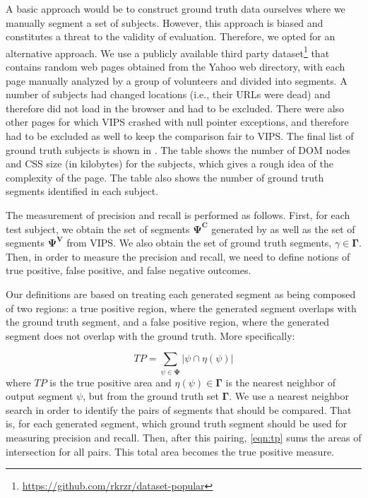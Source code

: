 A basic approach would be to construct ground truth data ourselves
where we manually segment a set of subjects.
However, this approach is biased
and constitutes a threat to the validity of evaluation.
Therefore, we opted for an alternative approach. 
We use a publicly available third party dataset\footnote{\url{https://github.com/rkrzr/dataset-popular}}
that contains random web pages obtained from the Yahoo web directory,
with each page manually analyzed by a group of volunteers and divided into segments. 
A number of subjects had changed locations (i.e., their URLs were dead)
and therefore did not load in the browser and had to be excluded.
There were also other pages for which 
VIPS crashed with null pointer exceptions,
and therefore had to be excluded as well to keep the comparison fair to VIPS.
The final list of ground truth subjects
is shown in .
The table shows the number of DOM nodes and CSS size (in kilobytes)
for the subjects, which gives a rough idea of the complexity of the page.
The table also shows the number of ground truth segments identified in each subject.



The measurement of precision and recall is performed as follows.
First, for each test subject,
we obtain the set of segments $\mathbf{\Psi^C}$ generated by \toolname
as well as the set of segments $\mathbf{\Psi^V}$ from VIPS.
We also obtain the set of ground truth segments, $\gamma \in \mathbf{\Gamma}$.
Then, in order to measure the precision and recall, we need to define 
notions of true positive, false positive, and false negative outcomes.

Our definitions are based on treating each generated segment as being composed of two regions:
a true positive region, where the generated segment overlaps with the ground truth segment,
and a false positive region, where the generated segment does not overlap with the ground truth. 
More specifically:

\begin{equation}
    \label{eqn:tp}
    TP = \sum_{\psi \in \mathbf{\Psi}} \vert \psi \cap \eta(\psi) \vert
\end{equation}
where $TP$ is the true positive area and $\eta(\psi) \in \mathbf{\Gamma}$ is the nearest neighbor of 
output segment $\psi$, but from the ground truth set $\mathbf{\Gamma}$. 
We use a nearest neighbor search in order to identify the pairs
of segments that should be compared. 
That is, for each generated segment, which ground truth segment
should be used for measuring precision and recall.
Then, after this pairing, \cref{eqn:tp} sums the areas of intersection
for all pairs. This total area becomes the true positive measure. 

